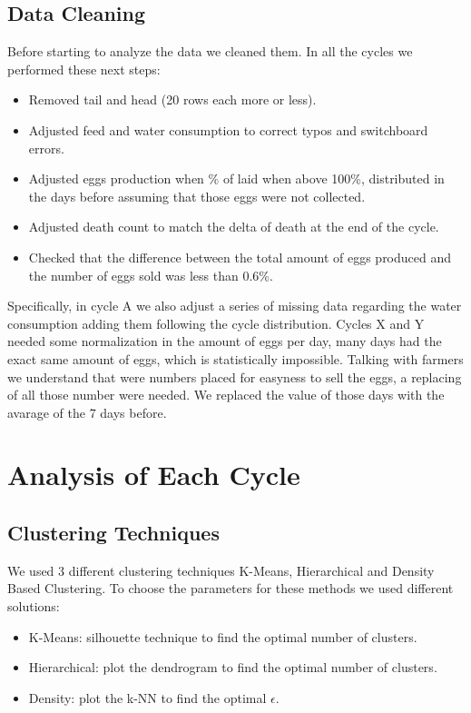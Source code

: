 \documentclass[11pt]{article}
\begin{document}
\subsection{Data Cleaning}
Before starting to analyze the data we cleaned them.
In all the cycles we performed these next steps:
\begin{itemize}
    \item Removed tail and head (20 rows each more or less).
    \item Adjusted feed and water consumption to correct typos and switchboard errors.
    \item Adjusted eggs production when \% of laid when above 100\%, distributed in the days before assuming that those eggs were not collected.
    \item Adjusted death count to match the delta of death at the end of the cycle.
    \item Checked that the difference between the total amount of eggs produced and the number of eggs sold was less than 0.6\%.
\end{itemize}

Specifically, in cycle A we also adjust a series of missing data regarding the water consumption adding them following the cycle distribution.
Cycles X and Y needed some normalization in the amount of eggs per day, many days had the exact same amount of eggs, which is statistically impossible. Talking with farmers we understand that were numbers placed for easyness to sell the eggs, a replacing of all those number were needed. We replaced the value of those days with the avarage of the 7 days before.



\section{Analysis of Each Cycle}
\subsection{Clustering Techniques}
We used 3 different clustering techniques K-Means, Hierarchical and Density Based Clustering.
To choose the parameters for these methods we used different solutions:
\begin{itemize}
    \item K-Means: silhouette technique to find the optimal number of clusters.
    \item Hierarchical: plot the dendrogram to find the optimal number of clusters.
    \item Density: plot the k-NN to find the optimal $\epsilon$.
\end{itemize}
\end{document}
